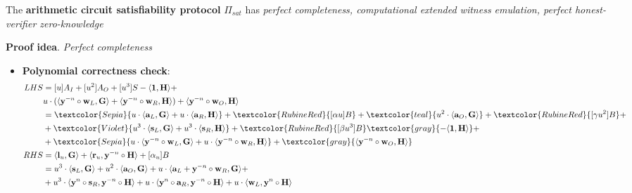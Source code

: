 \documentclass[../lecture-notes-148x210.tex]{subfiles}
\begin{document}
\begin{theorem}
    The \textbf{arithmetic circuit satisfiability protocol} $\Pi_{sat}$ has \textit{perfect completeness, computational extended witness emulation, perfect honest-verifier zero-knowledge}
    \label{th:arithmetic_circuit_satisfiability}
\end{theorem}
\textbf{Proof idea}. \textit{Perfect completeness} 
\begin{itemize}
    \item \textbf{Polynomial correctness check}:
    \begin{equation*}
        \begin{aligned}
            LHS &= [u]A_I + [u^2]A_O + [u^3]S - \langle \mathbf{1}, \mathbf{H} \rangle +\\
            &u \cdot (\langle \mathbf{y}^{-n} \circ \mathbf{w}_L, \mathbf{G} \rangle + \langle \mathbf{y}^{-n} \circ \mathbf{w}_R, \mathbf{H} \rangle) + \langle \mathbf{y}^{-n} \circ \mathbf{w}_O, \mathbf{H} \rangle \\
            &= \textcolor{Sepia}{u \cdot \langle \mathbf{a}_L, \mathbf{G} \rangle + u \cdot \langle \mathbf{a}_R, \mathbf{H} \rangle} + \textcolor{RubineRed}{[\alpha u]B} + \textcolor{teal}{u^2 \cdot \langle \mathbf{a}_O, \mathbf{G} \rangle} + \textcolor{RubineRed}{[\gamma u^2]B} + \\
            &+ \textcolor{Violet}{u^3 \cdot \langle \mathbf{s}_L, \mathbf{G} \rangle + u^3 \cdot \langle \mathbf{s}_R, \mathbf{H} \rangle} + \textcolor{RubineRed}{[\beta u^3]B} \textcolor{gray}{- \langle \mathbf{1}, \mathbf{H} \rangle} + \\
            &+ \textcolor{Sepia}{u \cdot \langle \mathbf{y}^{-n} \circ \mathbf{w}_L, \mathbf{G} \rangle + u\cdot \langle \mathbf{y}^{-n} \circ \mathbf{w}_R, \mathbf{H} \rangle} + \textcolor{gray}{\langle \mathbf{y}^{-n} \circ \mathbf{w}_O, \mathbf{H} \rangle} \\
            RHS &= \langle \mathbf{l}_u, \mathbf{G} \rangle + \langle \mathbf{r}_u, \mathbf{y}^{-n} \circ \mathbf{H} \rangle + [\alpha_u]B \\
            &= u^3 \cdot \langle \mathbf{s}_L, \mathbf{G} \rangle + u^2 \cdot \langle \mathbf{a}_O, \mathbf{G} \rangle + u \cdot \langle \mathbf{a}_L + \mathbf{y}^{-n} \circ \mathbf{w}_R, \mathbf{G} \rangle + \\
            &+ u^3 \cdot \langle \mathbf{y}^n \circ \mathbf{s}_R, \mathbf{y}^{-n} \circ \mathbf{H} \rangle + u \cdot \langle \mathbf{y}^n \circ \mathbf{a}_R, \mathbf{y}^{-n} \circ \mathbf{H} \rangle + u \cdot \langle \mathbf{w}_L, \mathbf{y}^n \circ \mathbf{H} \rangle \\

\end{aligned}
\end{equation*}
\end{itemize}
\end{document}
